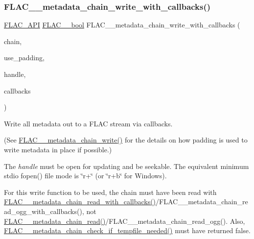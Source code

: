 \subsubsection{\texorpdfstring{FLAC\_\_metadata\_chain\_write\_with\_callbacks()}{FLAC\_\_metadata\_chain\_write\_with\_callbacks()}}
{\footnotesize\ttfamily \mbox{\hyperlink{group__flac__export_ga56ca07df8a23310707732b1c0007d6f5}{F\+L\+A\+C\+\_\+\+A\+PI}} \mbox{\hyperlink{ordinals_8h_a95103469f1cbd78b8cf250194985b34e}{F\+L\+A\+C\+\_\+\+\_\+bool}} F\+L\+A\+C\+\_\+\+\_\+metadata\+\_\+chain\+\_\+write\+\_\+with\+\_\+callbacks (\begin{DoxyParamCaption}\item[{\mbox{\hyperlink{group__flac__metadata__level2_gaec6993c60b88f222a52af86f8f47bfdf}{F\+L\+A\+C\+\_\+\+\_\+\+Metadata\+\_\+\+Chain}} $\ast$}]{chain,  }\item[{\mbox{\hyperlink{ordinals_8h_a95103469f1cbd78b8cf250194985b34e}{F\+L\+A\+C\+\_\+\+\_\+bool}}}]{use\+\_\+padding,  }\item[{\mbox{\hyperlink{group__flac__callbacks_ga4c329c3168dee6e352384c5e9306260d}{F\+L\+A\+C\+\_\+\+\_\+\+I\+O\+Handle}}}]{handle,  }\item[{\mbox{\hyperlink{struct_f_l_a_c_____i_o_callbacks}{F\+L\+A\+C\+\_\+\+\_\+\+I\+O\+Callbacks}}}]{callbacks }\end{DoxyParamCaption})}

Write all metadata out to a F\+L\+AC stream via callbacks.

(See \mbox{\hyperlink{group__flac__metadata__level2_gaa15ead7230217de8e79f4af822cda490}{F\+L\+A\+C\+\_\+\+\_\+metadata\+\_\+chain\+\_\+write()}} for the details on how padding is used to write metadata in place if possible.)

The {\itshape handle} must be open for updating and be seekable. The equivalent minimum stdio fopen() file mode is {\ttfamily \char`\"{}r+\char`\"{}} (or {\ttfamily \char`\"{}r+b\char`\"{}} for Windows).

For this write function to be used, the chain must have been read with \mbox{\hyperlink{group__flac__metadata__level2_ga061ae21b7836cd26f13345b897f05f3e}{F\+L\+A\+C\+\_\+\+\_\+metadata\+\_\+chain\+\_\+read\+\_\+with\+\_\+callbacks()}}/\+F\+L\+A\+C\+\_\+\+\_\+metadata\+\_\+chain\+\_\+read\+\_\+ogg\+\_\+with\+\_\+callbacks(), not \mbox{\hyperlink{group__flac__metadata__level2_gadb7d8e9a82aeb43e256f0a948adf5c45}{F\+L\+A\+C\+\_\+\+\_\+metadata\+\_\+chain\+\_\+read()}}/\+F\+L\+A\+C\+\_\+\+\_\+metadata\+\_\+chain\+\_\+read\+\_\+ogg(). Also, \mbox{\hyperlink{group__flac__metadata__level2_ga29a124cceaffce5376d073a032bd1c52}{F\+L\+A\+C\+\_\+\+\_\+metadata\+\_\+chain\+\_\+check\+\_\+if\+\_\+tempfile\+\_\+needed()}} must have returned {\ttfamily false}.


